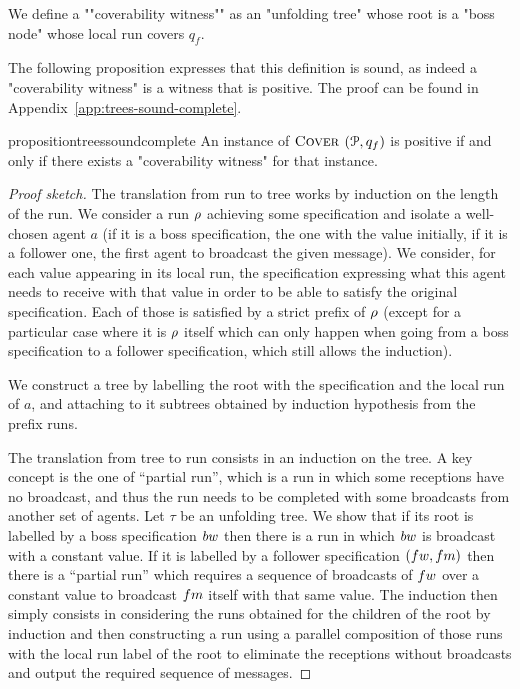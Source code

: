 \begin{definition}
\label{def:cov_witness}
We define a ""coverability witness"" as an "unfolding tree" whose root is a "boss node" whose local run covers $q_f$. 
\end{definition}

The following proposition expresses that this definition is sound, as indeed a "coverability witness" is a witness that \COVER is positive.
The proof can be found in Appendix~\ref{app:trees-sound-complete}.


\begin{restatable}{proposition}{treessoundcomplete}
\label{prop:trees-sound-complete}
An instance of $\textsc{Cover}$ $(\mathcal{P},q_f)$ is positive if and only if there exists a "coverability witness" for that instance.
\end{restatable}

\begin{proof}[Proof sketch]
The translation from run to tree works by induction on the length of the run. We consider a run $\rho$ achieving some specification and isolate a well-chosen agent $a$ (if it is a boss specification, the one with the value initially, if it is a follower one, the first agent to broadcast the given message). We consider, for each value appearing in its local run, the specification expressing what this agent needs to receive with that value in order to be able to satisfy the original specification. 
Each of those is satisfied by a strict prefix of $\rho$ (except for a particular case where it is $\rho$ itself which can only happen when going from a boss specification to a follower specification, which still allows the induction).

We construct a tree by labelling the root with the specification and the local run of $a$, and attaching to it subtrees obtained by induction hypothesis from the prefix runs.

The translation from tree to run consists in an induction on the tree. A key concept is the one of ``partial run'', which is a run in which some receptions have no broadcast, and thus the run needs to be completed with some broadcasts from another set of agents.
 Let $\tau$ be an unfolding tree. We show that if its root is labelled by a boss specification $\bossspec$ then there is a run in which $\bossspec$ is broadcast with a constant value. If it is labelled by a follower specification $(\followwordspec, \followmessagespec)$ then there is a ``partial run'' which requires a sequence of broadcasts of $\followwordspec$ over a constant value to broadcast $\followmessagespec$ itself with that same value.
 The induction then simply consists in considering the runs obtained for the children of the root by induction and then constructing a run using a parallel composition of those runs with the local run label of the root to eliminate the receptions without broadcasts and output the required sequence of messages. 
\end{proof}



